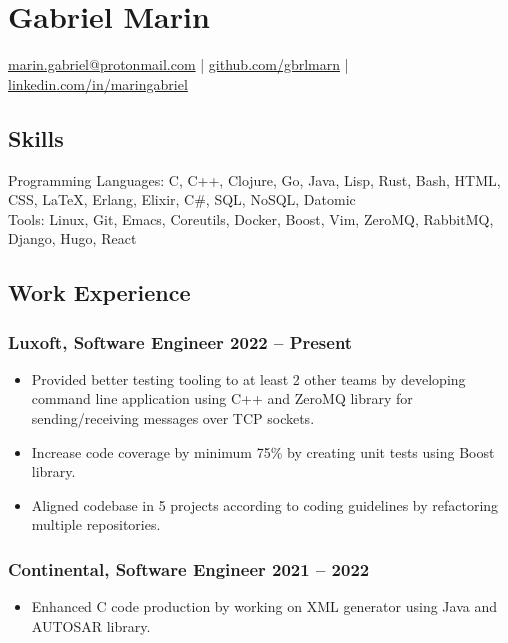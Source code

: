 \documentclass[a4paper,12pt]{article}
\date{}
\title{}
\begin{document}
\section*{\textbf{Gabriel Marin}}
\label{sec:org2b9cfd7}
\begin{center}
\href{mailto:marin.gabriel@protonmail.com}{marin.gabriel@protonmail.com} |
\href{https://github.com/gbrlmarn}{github.com/gbrlmarn} |
\href{https://linkedin.com/in/maringabriel}{linkedin.com/in/maringabriel}
\end{center}
\subsection*{\textbf{Skills}}
\label{sec:org94db9ae}
Programming Languages: C, C++, Clojure, Go, Java, Lisp, Rust,
Bash, HTML, CSS, \LaTeX{}, Erlang, Elixir, C\#, SQL, NoSQL, Datomic\\
Tools: Linux, Git, Emacs, Coreutils, Docker, Boost, Vim, ZeroMQ,
RabbitMQ, Django, Hugo, React
\subsection*{\textbf{Work Experience}}
\label{sec:orgac5ae8f}
\subsubsection*{\textbf{Luxoft}, Software Engineer \hfill 2022 -- Present}
\label{sec:org9d41cc9}
\begin{itemize}
\item Provided better testing tooling to at least 2 other teams by developing command line
application using C++ and ZeroMQ library for sending/receiving messages over TCP sockets.
\item Increase code coverage by minimum 75\% by creating unit tests using Boost library.
\item Aligned codebase in 5 projects according to coding guidelines
by refactoring multiple repositories.
\end{itemize}
\subsubsection*{\textbf{Continental}, Software Engineer \hfill 2021 -- 2022}
\label{sec:org8d7b9fb}
\begin{itemize}
\item Enhanced C code production by working on XML generator using Java and AUTOSAR library.
\end{itemize}
\end{document}
